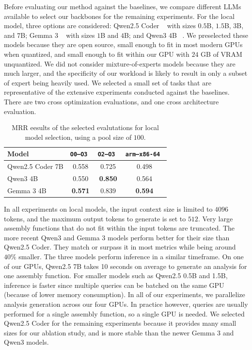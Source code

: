 Before evaluating our method against the baselines, we compare different LLMs available to select our backbones for the remaining experiments.
For the local model, three options are considered: Qwen2.5 Coder ~\cite{qwen2} with sizes \(0.5\)B, \(1.5\)B, \(3\)B, and \(7\)B;
Gemma 3 ~\cite{gemma3} with sizes \(1\)B and \(4\)B; and  Qwen3 \(4\)B ~\cite{qwen3}. We preselected these models because they are open source,
small enough to fit in most modern GPUs when quantized, and small enough to fit within our GPU with \(24\) GB of VRAM unquantized. We did not
consider mixture-of-experts models because they are much larger, and the specificity of our
workload is likely to result in only a subset of expert being heavily used. We selected a small set of tasks that are representative
of the extensive experiments conducted against the baselines. There are two cross optimization evaluations, and one cross architecture 
evaluation.
{
    \renewcommand{\arraystretch}{1.1}
    \begin{table}
    \centering
    \begin{tabular}{|l|ccc|} \hline
    Model            & \tt O0--O3 & \tt O2--O3 & \tt arm--x86-64 \\ \hline
    Qwen2.5 Coder 7B & 0.558      & 0.725      & 0.498            \\
    Qwen3 4B         & 0.550      & \bf 0.850  & 0.564            \\
    Gemma 3 4B       & \bf 0.571  & 0.839      & \bf 0.594        \\ \hline
    \end{tabular}
    \caption{MRR eesults of the selected evalutations for local model selection, using a pool size of \(100\).}
    \end{table}
}

In all experiments on local models, the input context size is limited to \(4096\) tokens, and the maximum output tokens to generate is set to \(512\).
Very large assembly functions that do not fit within the input tokens are truncated. The more recent Qwen3 and Gemma 3
models perform better for their size than Qwen2.5 Coder. They match or surpass it in most metrics while being around \(40\%\)
smaller. The three models perform inference in a similar timeframe. On one of our GPUs, Qwen2.5 7B takes 10 seconds on average to
generate an analysis for one assembly function. For smaller models such as Qwen2.5 0.5B and 1.5B, inference is faster since multiple queries
can be batched on the same GPU (because of lower memory consumption). In all of our experiments, we parallelize analysis generation across our four GPUs.
In practice however, queries are usually performed for a single assembly function, so a single GPU is needed. We selected Qwen2.5 Coder for the
remaining experiments because it provides many small sizes for our ablation study, and is more stable than the newer Gemma 3 and Qwen3 models.

